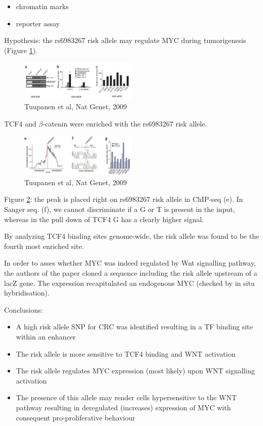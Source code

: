 \begin{itemize}
\tightlist
\item
  chromatin marks
\item
  reporter assay
\end{itemize}

Hypothesis: the rs6983267 risk allele may regulate MYC during tumorigenesis (Figure \ref{fig:rs1}).

\begin{figure}
\centering
\includegraphics[width=0.5\textwidth]{../_resources/Screenshot_2022-10-14_at_10-52-51.png}
\caption{Tuupanen et al, Nat Genet, 2009}
\label{fig:rs1}
\end{figure}

TCF4 and $\beta$-catenin were enriched with the rs6983267 risk allele.

\begin{figure}
\centering
\includegraphics[width=0.5\textwidth]{../_resources/Screenshot_2022-10-14_at_10-54-02.png}
\caption{Tuupanen et al, Nat Genet, 2009}
\label{fig:rs2}
\end{figure}

Figure \ref{fig:rs2}: the peak is placed right on rs6983267 risk allele in ChIP-seq (e). In Sanger seq. (f), we cannot discriminate if a G or T is present in the input, whereas in the pull down of TCF4 G has a clearly higher signal.

By analyzing TCF4 binding sites genome-wide, the risk allele was found to be the fourth most enriched site.

In order to asses whether MYC was indeed regulated by Wnt signalling pathway, the authors of the paper cloned a sequence including the risk allele upstream of a lacZ gene. The expression recapitulated an endogenous MYC (checked by in situ hybridisation).

Conclusions:

\begin{itemize}
\tightlist
\item
  A high risk allele SNP for CRC was identified resulting in a TF binding site within an enhancer
\item
  The risk allele is more sensitive to TCF4 binding and WNT activation
\item
  The risk allele regulates MYC expression (most likely) upon WNT signalling activation
\item
  The presence of this allele may render cells hypersensitive to the WNT pathway resulting in deregulated (increases) expression of MYC with consequent pro-proliferative behaviour
\end{itemize}


